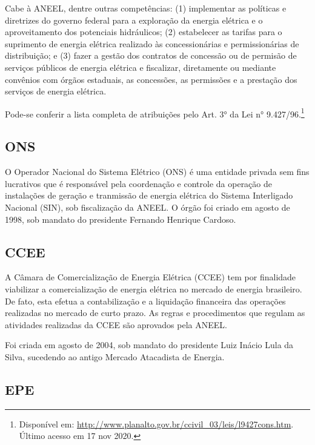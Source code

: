 \documentclass[aprovado,numbers]{coppe}
\begin{document}
  Cabe à ANEEL, dentre outras competências: (1) implementar as políticas e diretrizes do governo federal para a exploração da energia elétrica e o aproveitamento dos potenciais hidráulicos; (2) estabelecer as tarifas para o suprimento de energia elétrica realizado às concessionárias e permissionárias de distribuição; e (3) fazer a gestão dos contratos de concessão ou de permisão de serviços públicos de energia elétrica e fiscalizar, diretamente ou mediante convênios com órgãos estaduais, as concessões, as permissões e a prestação dos serviços de energia elétrica.

  Pode-se conferir a lista completa de atribuições pelo Art. 3° da Lei n° 9.427/96.\footnote{Disponível em: \url{http://www.planalto.gov.br/ccivil_03/leis/l9427cons.htm}. Último acesso em 17 nov 2020.}

  \hypertarget{ons}{%
  \subsection{ONS}\label{ons}}

  O Operador Nacional do Sistema Elétrico (ONS) é uma entidade privada sem fins lucrativos que é responsável pela coordenação e controle da operação de instalações de geração e tranmissão de energia elétrica do Sistema Interligado Nacional (SIN), sob fiscalização da ANEEL. O órgão foi criado em agosto de 1998, sob mandato do presidente Fernando Henrique Cardoso.

  \hypertarget{ccee}{%
  \subsection{CCEE}\label{ccee}}

  A Câmara de Comercialização de Energia Elétrica (CCEE) tem por finalidade viabilizar a comercialização de energia elétrica no mercado de energia brasileiro. De fato, esta efetua a contabilização e a liquidação financeira das operações realizadas no mercado de curto prazo. As regras e procedimentos que regulam as atividades realizadas da CCEE são aprovados pela ANEEL.

  Foi criada em agosto de 2004, sob mandato do presidente Luiz Inácio Lula da Silva, sucedendo ao antigo Mercado Atacadista de Energia.

  \hypertarget{epe}{%
  \subsection{EPE}\label{epe}}
\end{document}
